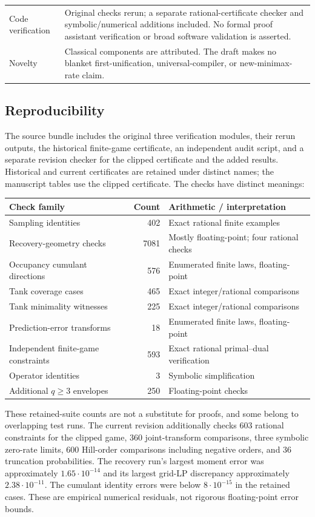 \documentclass[11pt]{article}
\numberwithin{equation}{section}
\theoremstyle{definition}
\theoremstyle{remark}
\begin{document}
\begin{longtable}{@{}>{\raggedright\arraybackslash}p{}>{\raggedright\arraybackslash}p{}@{}}
Code verification & Original checks rerun; a separate rational-certificate checker and symbolic/numerical additions included. No formal proof assistant verification or broad software validation is asserted.\\[4pt]
Novelty & Classical components are attributed. The draft makes no blanket first-unification, universal-compiler, or new-minimax-rate claim.\\
\end{longtable}

\subsection{Reproducibility}
The source bundle includes the original three verification modules, their rerun outputs, the historical finite-game certificate, an independent audit script, and a separate revision checker for the clipped certificate and the added results. Historical and current certificates are retained under distinct names; the manuscript tables use the clipped certificate. The checks have distinct meanings:
\begin{center}\small
\begin{tabular}{p{}rp{}}
\toprule
Check family & Count & Arithmetic / interpretation\\
\midrule
Sampling identities & 402 & Exact rational finite examples\\
Recovery-geometry checks & 7081 & Mostly floating-point; four rational checks\\
Occupancy cumulant directions & 576 & Enumerated finite laws, floating-point\\
Tank coverage cases & 465 & Exact integer/rational comparisons\\
Tank minimality witnesses & 225 & Exact integer/rational comparisons\\
Prediction-error transforms & 18 & Enumerated finite laws, floating-point\\
Independent finite-game constraints & 593 & Exact rational primal--dual verification\\
Operator identities & 3 & Symbolic simplification\\
Additional $q\ge3$ envelopes & 250 & Floating-point checks\\
\bottomrule
\end{tabular}
\end{center}
These retained-suite counts are not a substitute for proofs, and some belong to overlapping test runs. The current revision additionally checks 603 rational constraints for the clipped game, 360 joint-transform comparisons, three symbolic zero-rate limits, 600 Hill-order comparisons including negative orders, and 36 truncation probabilities. The recovery run's largest moment error was approximately $1.65\cdot10^{-14}$ and its largest grid-LP discrepancy approximately $2.38\cdot10^{-11}$. The cumulant identity errors were below $8\cdot10^{-15}$ in the retained cases. These are empirical numerical residuals, not rigorous floating-point error bounds.
\end{document}
